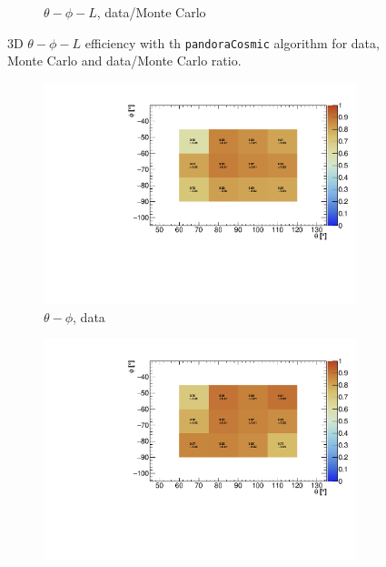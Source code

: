 \documentclass[a4paper]{scrartcl}
\begin{document}
\begin{figure}[htbp]
\begin{center}
\begin{subfigure}{0.52\textwidth}
\caption{$\theta - \phi - L$, data/Monte Carlo}\label{fig:3d_cry_ratio}
\end{subfigure}
\caption{3D $\theta - \phi - L$ efficiency with th \texttt{pandoraCosmic} algorithm for data, Monte Carlo and data/Monte Carlo ratio.} \label{fig:cry_mc_3d}
\end{center}
\end{figure}

\begin{figure}[htbp]
\begin{center}
\begin{subfigure}{0.52\textwidth}
\includegraphics[width=\linewidth]{figures/theta_phi_data.pdf}
\caption{$\theta - \phi$, data} \label{fig:2d_cry}
\end{subfigure}\begin{subfigure}{0.52\textwidth}
\includegraphics[width=\linewidth]{figures/theta_phi_mc.pdf}

\end{subfigure}
\end{center}
\end{figure}
\end{document}
